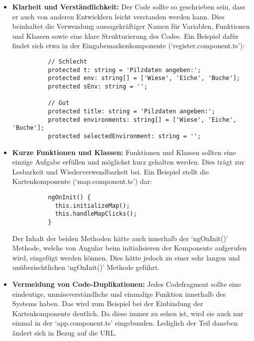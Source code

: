 \documentclass[../main.tex]{subfiles}
\begin{document}
\begin{itemize}

	\item \textbf{Klarheit und Verständlichkeit:}
	      Der Code sollte so geschrieben sein, dass er auch von anderen Entwicklern leicht verstanden werden kann. Dies beinhaltet die Verwendung aussagekräftiger
	      Namen für Variablen, Funktionen und Klassen sowie eine klare Strukturierung des Codes. Ein Beispiel dafür findet sich etwa in der Eingabemaskenkomponente
	      (`register.component.ts'):

	      \begin{verbatim}
          // Schlecht
          protected t: string = 'Pilzdaten angeben:';
          protected env: string[] = ['Wiese', 'Eiche', 'Buche'];
          protected sEnv: string = '';

          // Gut
          protected title: string = 'Pilzdaten angeben:';
          protected environments: string[] = ['Wiese', 'Eiche', 'Buche'];
          protected selectedEnvironment: string = '';
        \end{verbatim}

	\item \textbf{Kurze Funktionen und Klassen:}
	      Funktionen und Klassen sollten eine einzige Aufgabe erfüllen und möglichst kurz gehalten werden. Dies trägt zur Lesbarkeit und Wiederverwendbarkeit bei.
	      Ein Beispiel stellt die Kartenkomponente (`map.component.ts') dar:

	      \begin{verbatim}
          ngOnInit() {
            this.initializeMap();
            this.handleMapClicks();
          }
        \end{verbatim}

	      Der Inhalt der beiden Methoden hätte auch innerhalb der `ngOnInit()' Methode, welche von Angular beim initialisieren der Komponente aufgerufen wird,
	      eingefügt werden können. Dies hätte jedoch zu einer sehr langen und unüberischtlichen `ngOnInit()' Methode geführt.

	\item \textbf{Vermeidung von Code-Duplikationen:}
	      Jedes Codefragment sollte eine eindeutige, unmissverständliche und einmalige Funktion innerhalb des Systems haben. Das wird zum Beispiel bei der Einbindung
	      der Kartenkomponente deutlich. Da diese immer zu sehen ist, wird sie auch nur einmal in der `app.component.ts' eingebunden. Lediglich der Teil daneben ändert
	      sich in Bezug auf die URL.


\end{itemize}
\end{document}
